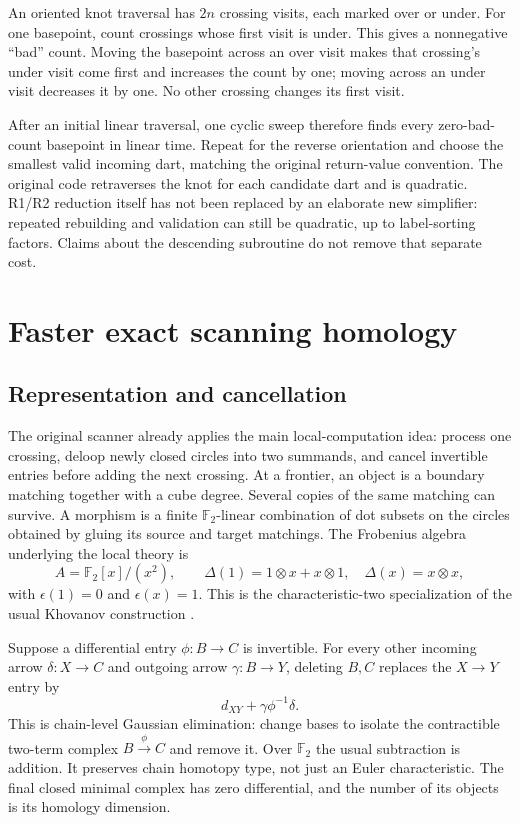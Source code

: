 \documentclass[11pt,letterpaper]{article}
\theoremstyle{definition}
\newcommand{\F}{\mathbb F_2}
\begin{document}
An oriented knot traversal has $2n$ crossing visits, each marked over or under.
For one basepoint, count crossings whose first visit is under. This gives a
nonnegative ``bad'' count. Moving the basepoint across an over visit makes that
crossing's under visit come first and increases the count by one; moving across
an under visit decreases it by one. No other crossing changes its first visit.

After an initial linear traversal, one cyclic sweep therefore finds every
zero-bad-count basepoint in linear time. Repeat for the reverse orientation and
choose the smallest valid incoming dart, matching the original return-value
convention. The original code retraverses the knot for each candidate dart and
is quadratic. R1/R2 reduction itself has not been replaced by an elaborate new
simplifier: repeated rebuilding and validation can still be quadratic, up to
label-sorting factors. Claims about the descending subroutine do not remove
that separate cost.

\section[Scanning homology]{Faster exact scanning homology}\label{sec:scan}

\subsection{Representation and cancellation}

The original scanner already applies the main local-computation idea: process
one crossing, deloop newly closed circles into two summands, and cancel
invertible entries before adding the next crossing. At a frontier, an object
is a boundary matching together with a cube degree. Several copies of the same
matching can survive. A morphism is a finite $\F$-linear combination of dot
subsets on the circles obtained by gluing its source and target matchings.
The Frobenius algebra underlying the local theory is
\[
 A=\F[x]/(x^2),\qquad
 \Delta(1)=1\otimes x+x\otimes1,\quad
 \Delta(x)=x\otimes x,
\]
with $\epsilon(1)=0$ and $\epsilon(x)=1$. This is the characteristic-two
specialization of the usual Khovanov construction \cite{khovanov}.

Suppose a differential entry $\phi:B\to C$ is invertible. For every other
incoming arrow $\delta:X\to C$ and outgoing arrow $\gamma:B\to Y$, deleting
$B,C$ replaces the $X\to Y$ entry by
\begin{equation}\label{eq:schur}
 d_{XY}+\gamma\phi^{-1}\delta.
\end{equation}
This is chain-level Gaussian elimination: change bases to isolate the
contractible two-term complex $B\xrightarrow{\phi}C$ and remove it. Over $\F$
the usual subtraction is addition. It preserves chain homotopy type, not just
an Euler characteristic. The final closed minimal complex has zero
differential, and the number of its objects is its homology dimension.
\end{document}
